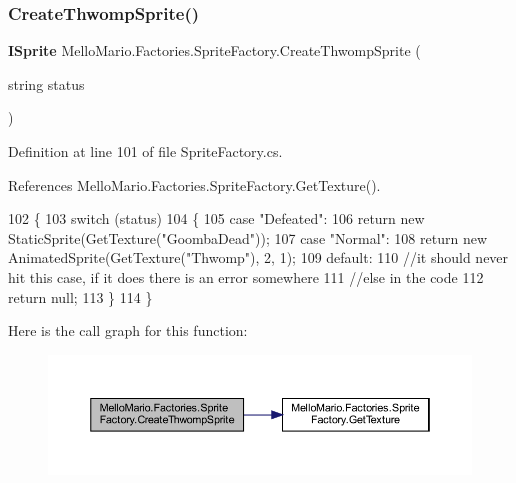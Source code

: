 \subsubsection{Create\+Thwomp\+Sprite()}
{\footnotesize\ttfamily \textbf{ I\+Sprite} Mello\+Mario.\+Factories.\+Sprite\+Factory.\+Create\+Thwomp\+Sprite (\begin{DoxyParamCaption}\item[{string}]{status }\end{DoxyParamCaption})}



Definition at line 101 of file Sprite\+Factory.\+cs.



References Mello\+Mario.\+Factories.\+Sprite\+Factory.\+Get\+Texture().


\begin{DoxyCode}
102         \{
103             \textcolor{keywordflow}{switch} (status)
104             \{
105                 \textcolor{keywordflow}{case} \textcolor{stringliteral}{"Defeated"}:
106                     \textcolor{keywordflow}{return} \textcolor{keyword}{new} StaticSprite(GetTexture(\textcolor{stringliteral}{"GoombaDead"}));
107                 \textcolor{keywordflow}{case} \textcolor{stringliteral}{"Normal"}:
108                     \textcolor{keywordflow}{return} \textcolor{keyword}{new} AnimatedSprite(GetTexture(\textcolor{stringliteral}{"Thwomp"}), 2, 1);
109                 \textcolor{keywordflow}{default}:
110                     \textcolor{comment}{//it should never hit this case, if it does there is an error somewhere}
111                     \textcolor{comment}{//else in the code}
112                     \textcolor{keywordflow}{return} null;
113             \}
114         \}
\end{DoxyCode}
Here is the call graph for this function\+:
\nopagebreak
\begin{figure}[H]
\begin{center}
\leavevmode
\includegraphics[width=350pt]{classMelloMario_1_1Factories_1_1SpriteFactory_ab0a7ed9dbba09c7ecbc036ac65a4a109_cgraph}
\end{center}
\end{figure}
\mbox{\label{classMelloMario_1_1Factories_1_1SpriteFactory_a4310b74d9b5975a309ee1c12ee33f96e}} 
